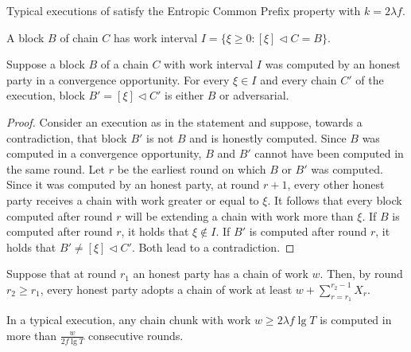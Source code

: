 \begin{conjecture}
  Typical executions of \poem satisfy the Entropic Common Prefix property
  with $k = 2 \lambda f$.
\end{conjecture}

\begin{definition}
  A block $B$ of chain $C$ has work interval
  $I = \{\xi \geq 0: [\xi] \lhd C = B\}$.
\end{definition}


\begin{lemma}
  Suppose a block $B$ of a chain $C$ with work interval $I$
  was computed by an honest party in a convergence opportunity.
  For every $\xi \in I$ and every chain $C'$ of the execution,
  block $B' = [\xi] \lhd C'$ is either $B$ or adversarial.
\end{lemma}
\begin{proof}
  Consider an execution as in the statement and suppose, towards a contradiction,
  that block $B'$ is not $B$ and is honestly computed.
  Since $B$ was computed in a convergence opportunity, $B$ and $B'$
  cannot have been computed in the same round. Let $r$ be the earliest round
  on which $B$ or $B'$ was computed. Since it was computed by
  an honest party, at round $r + 1$, every other honest party receives
  a chain with work greater or equal to $\xi$.
  It follows that every block computed
  after round $r$ will be extending a chain with work more than $\xi$.
  If $B$ is computed after round $r$, it holds that $\xi \not \in I$.
  If $B'$ is computed after round $r$, it holds that $B' \neq [\xi] \lhd C'$.
  Both lead to a contradiction.
\end{proof}

\begin{conjecture}
  Suppose that at round $r_1$ an honest party has a chain of work $w$.
  Then, by round $r_2 \geq r_1$, every honest party adopts a chain of work at least
  $w + \sum_{r = r_1}^{r_2 - 1}{X_r}$.
\end{conjecture}


\begin{conjecture}
  In a typical execution, any chain chunk with work $w \geq 2 \lambda f \lg T$ is computed
  in more than $\frac{w}{2 f \lg T}$ consecutive rounds.
\end{conjecture}


